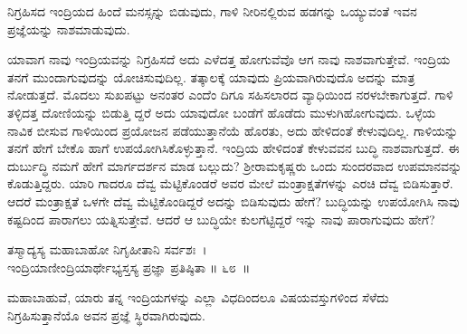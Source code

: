 \begin{artha}
ನಿಗ್ರಹಿಸದ ಇಂದ್ರಿಯದ ಹಿಂದೆ ಮನಸ್ಸನ್ನು ಬಿಡುವುದು, ಗಾಳಿ ನೀರಿನಲ್ಲಿರುವ ಹಡಗನ್ನು ಒಯ್ಯುವಂತೆ ಇವನ ಪ್ರಜ್ಞೆಯನ್ನು ನಾಶಮಾಡುವುದು.
\end{artha}

ಯಾವಾಗ ನಾವು ಇಂದ್ರಿಯವನ್ನು ನಿಗ್ರಹಿಸದೆ ಅದು ಎಳೆದತ್ತ ಹೋಗುವೆವೊ ಆಗ ನಾವು ನಾಶವಾಗುತ್ತೇವೆ. ಇಂದ್ರಿಯ ತನಗೆ ಮುಂದಾಗುವುದನ್ನು ಯೋಚಿಸುವುದಿಲ್ಲ. ತತ್ಕಾಲಕ್ಕೆ ಯಾವುದು ಪ್ರಿಯವಾಗಿರುವುದೊ ಅದನ್ನು ಮಾತ್ರ ನೋಡುತ್ತದೆ. ಮೊದಲು ಸುಖಪಟ್ಟು ಅನಂತರ ಎಂದೆಂ ದಿಗೂ ಸಹಿಸಲಾರದ ವ್ಯಾಧಿಯಿಂದ ನರಳಬೇಕಾಗುತ್ತದೆ. ಗಾಳಿ ತಳ್ಳಿದತ್ತ ದೋಣಿಯನ್ನು ಬಿಡುತ್ತಿ ದ್ದರೆ ಅದು ಯಾವುದೋ ಬಂಡೆಗೆ ಹೊಡೆದು ಮುಳುಗಿಹೋಗುವುದು. ಒಳ್ಳೆಯ ನಾವಿಕ ಬೀಸುವ ಗಾಳಿಯಿಂದ ಪ್ರಯೋಜನ ಪಡೆಯುತ್ತಾನೆಯೆ ಹೊರತು, ಅದು ಹೇಳಿದಂತೆ ಕೇಳುವುದಿಲ್ಲ. ಗಾಳಿಯನ್ನು ತನಗೆ ಹೇಗೆ ಬೇಕೊ ಹಾಗೆ ಉಪಯೋಗಿಸಿಕೊಳ್ಳುತ್ತಾನೆ. ಇಂದ್ರಿಯ ಹೇಳಿದಂತೆ ಕೇಳುವವನ ಬುದ್ಧಿ ನಾಶವಾಗುತ್ತದೆ. ಈ ದುರ್ಬುದ್ಧಿ ನಮಗೆ ಹೇಗೆ ಮಾರ್ಗದರ್ಶನ ಮಾಡ ಬಲ್ಲುದು? ಶ‍್ರೀರಾಮಕೃಷ್ಣರು ಒಂದು ಸುಂದರವಾದ ಉಪಮಾನವನ್ನು ಕೊಡುತ್ತಿದ್ದರು. ಯಾರಿ ಗಾದರೂ ದೆವ್ವ ಮೆಟ್ಟಿಕೊಂಡರೆ ಅವರ ಮೇಲೆ ಮಂತ್ರಾಕ್ಷತೆಗಳನ್ನು ಎರಚಿ ದೆವ್ವ ಬಿಡಿಸುತ್ತಾರೆ. ಆದರೆ ಮಂತ್ರಾಕ್ಷತೆ ಒಳಗೇ ದೆವ್ವ ಮೆಟ್ಟಿಕೊಂಡಿದ್ದರೆ ಅದನ್ನು ಬಿಡಿಸುವುದು ಹೇಗೆ? ಬುದ್ಧಿಯನ್ನು ಉಪಯೋಗಿಸಿ ನಾವು ಕಷ್ಟದಿಂದ ಪಾರಾಗಲು ಯತ್ನಿಸುತ್ತೇವೆ. ಆದರೆ ಆ ಬುದ್ಧಿಯೇ ಕುಲಗೆಟ್ಟಿದ್ದರೆ ಇನ್ನು ನಾವು ಪಾರಾಗುವುದು ಹೇಗೆ?\\

\begin{shloka}
ತಸ್ಮಾದ್ಯಸ್ಯ ಮಹಾಬಾಹೋ ನಿಗೃಹೀತಾನಿ ಸರ್ವಶಃ~।\\ಇಂದ್ರಿಯಾಣೀಂದ್ರಿಯಾರ್ಥೇಭ್ಯಸ್ತಸ್ಯ ಪ್ರಜ್ಞಾ ಪ್ರತಿಷ್ಠಿತಾ \hfill॥ ೬೮~॥
\end{shloka}

\begin{artha}
ಮಹಾಬಾಹುವೆ, ಯಾರು ತನ್ನ ಇಂದ್ರಿಯಗಳನ್ನು ಎಲ್ಲಾ ವಿಧದಿಂದಲೂ ವಿಷಯವಸ್ತುಗಳಿಂದ ಸೆಳೆದು ನಿಗ್ರಹಿಸುತ್ತಾನೆಯೊ ಅವನ ಪ್ರಜ್ಞೆ ಸ್ಥಿರವಾಗಿರುವುದು.
\end{artha}

\newpage

